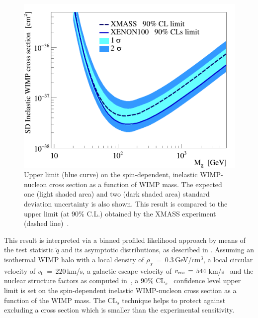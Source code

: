 \begin{figure}[t]
  \includegraphics[width=\linewidth]{limit_reb.png}
  \caption{Upper limit (blue curve) on the spin-dependent, inelastic WIMP-nucleon cross section as a function of WIMP mass.  
	  The expected one (light shaded area) and two (dark shaded area) standard deviation uncertainty is also shown. 
	  This result is compared to the upper limit (at 90\% C.L.) obtained by the XMASS experiment (dashed line)~\cite{Uchida:2014cnn}.}
  \label{fig:limits}
\end{figure}

This result is interpreted via a binned profiled likelihood approach by means of the test statistic $\tilde{q}$
and its asymptotic distributions, as  described in \cite{asympt}. 
Assuming  an isothermal WIMP halo with a local density of $\rho_{\chi} \, = \, 0.3$\,GeV/cm$^3$, a local circular velocity of $v_0 \,= \, 220$\,km/s, 
a galactic escape velocity of $v_{\rm{esc}} \, = \, 544$\,km/s~\cite{Smith:2006ym}  
and the nuclear structure factors as computed in~\cite{Baudis:2013bba}, 
a 90\% CL$_s$~\cite{cls} confidence level upper limit is set on the spin-dependent inelastic WIMP-nucleon cross section as a function of the WIMP mass. 
{\ale The CL$_s$ technique helps to protect against excluding  a cross section which is smaller than the experimental sensitivity.}



